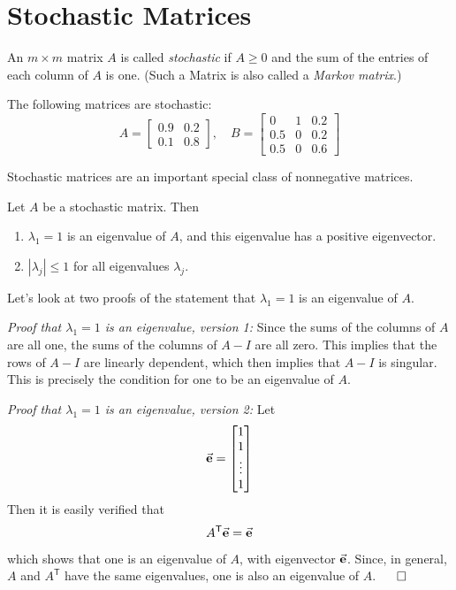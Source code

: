 \section{Stochastic Matrices}
\begin{definition}
An $m\times m$ matrix $A$ is called \emph{stochastic}
if $A \ge 0$ and the sum of the entries
of each column of $A$ is one.
(Such a Matrix is also called a \emph{Markov matrix}.)
\end{definition}
\begin{xexample}
The following matrices are stochastic:
\begin{equation}
  A = \begin{bmatrix}
          0.9 & 0.2 \\ 0.1 & 0.8
      \end{bmatrix},
  \quad
  B = \begin{bmatrix}
          0 & 1 & 0.2 \\ 0.5 & 0 & 0.2 \\ 0.5 & 0 & 0.6
      \end{bmatrix}
\end{equation}
\end{xexample}
Stochastic matrices are an important special class of
nonnegative matrices.
\begin{theorem}
Let $A$ be a stochastic matrix. Then
\begin{enumerate}
\item $\lambda_1 = 1$ is an eigenvalue of $A$,
and this eigenvalue has a positive eigenvector.
\item $|\lambda_j| \le 1$ for all eigenvalues $\lambda_j$.
\end{enumerate}
\end{theorem}
%
Let's look at two proofs of the statement that
$\lambda_1=1$ is an eigenvalue of $A$.

\emph{Proof that $\lambda_1=1$ is an eigenvalue, version 1:}
Since the sums of the columns of $A$ are all one,
the sums of the columns of $A-I$ are all zero.
This implies that the rows of $A-I$ are linearly
dependent, which then implies that
$A-I$ is singular.  This is precisely the condition
for one to be an eigenvalue of $A$.

\emph{Proof that $\lambda_1=1$ is an eigenvalue, version 2:}
Let
\begin{equation}
   \vec{\textbf{e}} = \begin{bmatrix} 1 \\ 1 \\ \vdots \\ 1\end{bmatrix}
\end{equation}
Then it is easily verified that
\begin{equation}
  A^{\textsf{T}}\vec{\textbf{e}} = \vec{\textbf{e}}
\end{equation}
which shows that one is an eigenvalue of $A$, with
eigenvector $\vec{\textbf{e}}$.
Since, in general, $A$ and $A^{\textsf{T}}$ have the
same eigenvalues, one is also an eigenvalue of $A$.
\hfill $\qed$

